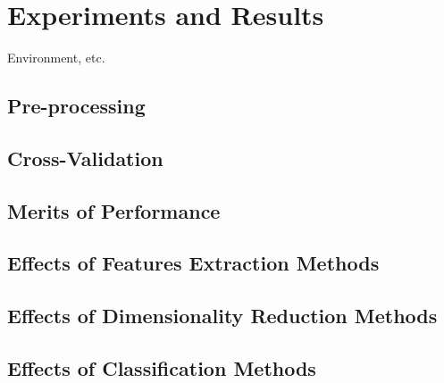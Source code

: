 \chapter{Experiments and Results}
\label{chap:experiments}

Environment, etc.

\section{Pre-processing}
\label{sec:pre-processing}

\section{Cross-Validation}

\section{Merits of Performance}

\section{Effects of Features Extraction Methods}
\label{sec:effects-fe}

\section{Effects of Dimensionality Reduction Methods}

\section{Effects of Classification Methods}

